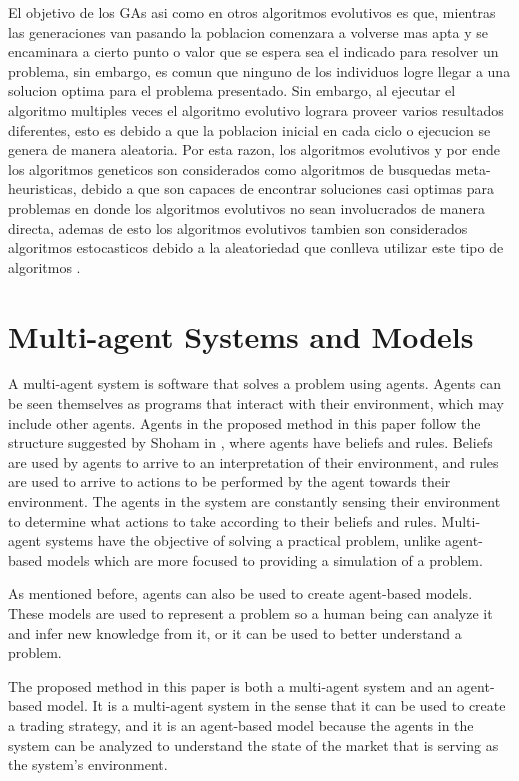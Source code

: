 El objetivo de los GAs asi como en otros algoritmos evolutivos es que, mientras
las generaciones van pasando la poblacion comenzara a volverse mas apta y se
encaminara a cierto punto o valor que se espera sea el indicado para resolver un
problema, sin embargo, es comun que ninguno de los individuos logre llegar a una
solucion optima para el problema presentado. Sin embargo, al ejecutar el
algoritmo multiples veces el algoritmo evolutivo lograra proveer varios
resultados diferentes, esto es debido a que la poblacion inicial en cada ciclo o
ejecucion se genera de manera aleatoria. Por esta razon, los algoritmos
evolutivos y por ende los algoritmos geneticos son considerados como algoritmos
de busquedas meta-heuristicas, debido a que son capaces de encontrar soluciones
casi optimas para problemas en donde los algoritmos evolutivos no sean
involucrados de manera directa, ademas de esto los algoritmos evolutivos tambien
son considerados algoritmos estocasticos debido a la aleatoriedad que conlleva
utilizar este tipo de algoritmos \cite{Harik1999}.

\section{Multi-agent Systems and Models}
\label{section:multi-agent-systems-and-models}

A multi-agent system is software that solves a problem using agents. Agents can
be seen themselves as programs that interact with their environment, which may
include other agents. Agents in the proposed method in this paper follow the
structure suggested by Shoham in \cite{Shoham1993}, where agents have beliefs
and rules. Beliefs are used by agents to arrive to an interpretation of their
environment, and rules are used to arrive to actions to be performed by the
agent towards their environment. The agents in the system are constantly sensing
their environment to determine what actions to take according to their beliefs
and rules. Multi-agent systems have the objective of solving a practical
problem, unlike agent-based models which are more focused to providing a
simulation of a problem.

As mentioned before, agents can also be used to create agent-based models. These
models are used to represent a problem so a human being can analyze it and infer
new knowledge from it, or it can be used to better understand a problem.

The proposed method in this paper is both a multi-agent system and an
agent-based model. It is a multi-agent system in the sense that it can be used
to create a trading strategy, and it is an agent-based model because the agents
in the system can be analyzed to understand the state of the market that is
serving as the system's environment.
